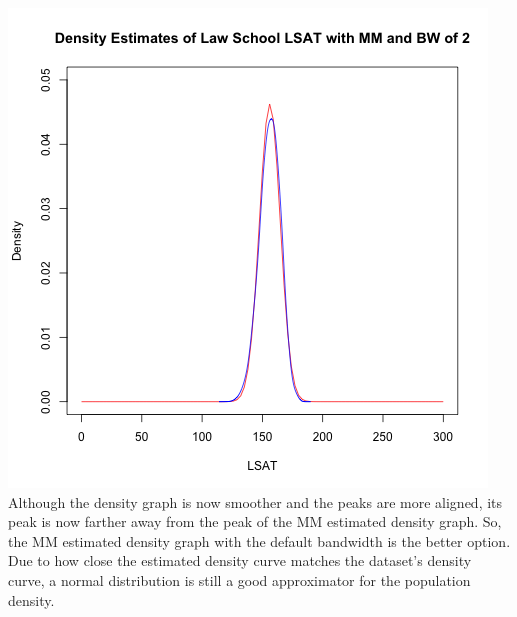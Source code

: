 \documentclass[12pt, letterpaper]{article}
\begin{document}
\includegraphics[scale=0.85]{Lawschool_LSAT_Density_mmbw} \\
Although the density graph is now smoother and the peaks are more aligned, its peak is now farther away from the peak of the MM estimated density graph. So, the MM estimated density graph with the default bandwidth is the better option. Due to how close the estimated density curve matches the dataset's density curve, a normal distribution is still a good approximator for the population density. 
\end{document}
